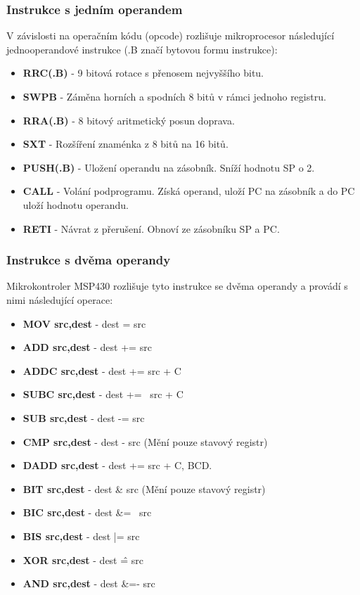 \subsubsection{Instrukce s jedním operandem}

V závislosti na operačním kódu (opcode) rozlišuje mikroprocesor následující jednooperandové instrukce (.B značí bytovou formu instrukce):

\begin{itemize}
\item \textbf{RRC(.B)} - 9 bitová rotace s přenosem nejvyššího bitu.
\item \textbf{SWPB} - Záměna horních a spodních 8 bitů v rámci jednoho registru.
\item \textbf{RRA(.B)} - 8 bitový aritmetický posun doprava.
\item \textbf{SXT} - Rozšíření znaménka z 8 bitů na 16 bitů.
\item \textbf{PUSH(.B)} - Uložení operandu na zásobník. Sníží hodnotu SP o 2.
\item \textbf{CALL} - Volání podprogramu. Získá operand, uloží PC na zásobník a do PC uloží hodnotu operandu.
\item \textbf{RETI} - Návrat z přerušení. Obnoví ze zásobníku SP a PC.
\end{itemize}

\subsubsection{Instrukce s dvěma operandy}

Mikrokontroler MSP430 rozlišuje tyto instrukce se dvěma operandy a provádí s nimi následující operace:

\begin{itemize}
\item \textbf{MOV src,dest} - dest = src
\item \textbf{ADD src,dest} - dest += src
\item \textbf{ADDC src,dest} - dest += src + C
\item \textbf{SUBC src,dest} - dest += ~src + C
\item \textbf{SUB src,dest} - dest -= src
\item \textbf{CMP src,dest} - dest - src (Mění pouze stavový registr)
\item \textbf{DADD src,dest} - dest += src + C, BCD.
\item \textbf{BIT src,dest} - dest \& src (Mění pouze stavový registr)
\item \textbf{BIC src,dest} - dest \&= ~src
\item \textbf{BIS src,dest} - dest |= src
\item \textbf{XOR src,dest} - dest \^ = src
\item \textbf{AND src,dest} - dest \&=- src
\end{itemize}

